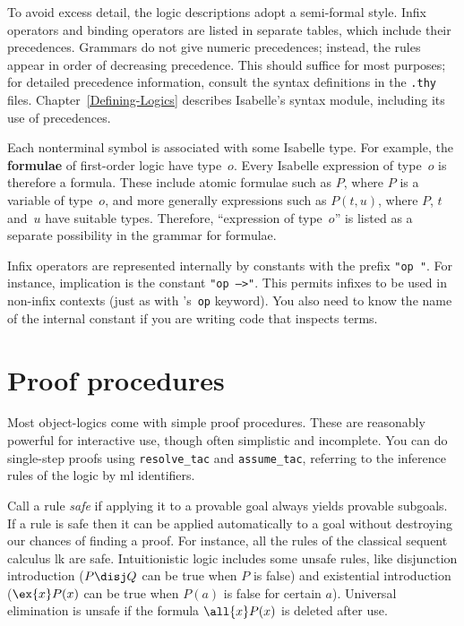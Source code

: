 To avoid excess detail, the logic descriptions adopt a semi-formal style.
Infix operators and binding operators are listed in separate tables, which
include their precedences.  Grammars do not give numeric precedences;
instead, the rules appear in order of decreasing precedence.  This should
suffice for most purposes; for detailed precedence information, consult the
syntax definitions in the {\tt.thy} files.  Chapter~\ref{Defining-Logics}
describes Isabelle's syntax module, including its use of precedences.

Each nonterminal symbol is associated with some Isabelle type.  For
example, the {\bf formulae} of first-order logic have type~$o$.  Every
Isabelle expression of type~$o$ is therefore a formula.  These include
atomic formulae such as $P$, where $P$ is a variable of type~$o$, and more
generally expressions such as $P(t,u)$, where $P$, $t$ and~$u$ have
suitable types.  Therefore, ``expression of type~$o$'' is listed as a
separate possibility in the grammar for formulae.

Infix operators are represented internally by constants with the prefix
\hbox{\tt"op "}.  For instance, implication is the constant
\hbox{\tt"op~-->"}.  This permits infixes to be used in non-infix contexts
(just as with \ML's~{\tt op} keyword).  You also need to know the name of
the internal constant if you are writing code that inspects terms.


\section{Proof procedures}
Most object-logics come with simple proof procedures.  These are reasonably
powerful for interactive use, though often simplistic and incomplete.  You
can do single-step proofs using \verb|resolve_tac| and
\verb|assume_tac|, referring to the inference rules of the logic by {\sc
ml} identifiers.

Call a rule {\em safe\/} if applying it to a provable goal always yields
provable subgoals.  If a rule is safe then it can be applied automatically
to a goal without destroying our chances of finding a proof.  For instance,
all the rules of the classical sequent calculus {\sc lk} are safe.
Intuitionistic logic includes some unsafe rules, like disjunction
introduction ($P\disj Q$ can be true when $P$ is false) and existential
introduction ($\ex{x}P(x)$ can be true when $P(a)$ is false for certain
$a$).  Universal elimination is unsafe if the formula $\all{x}P(x)$ is
deleted after use.

